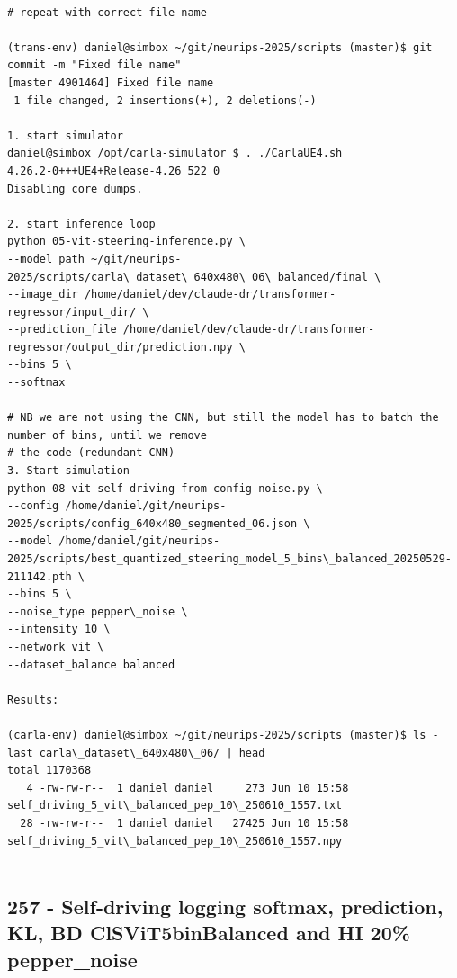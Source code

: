 \begin{verbatim}

# repeat with correct file name

(trans-env) daniel@simbox ~/git/neurips-2025/scripts (master)$ git commit -m "Fixed file name"
[master 4901464] Fixed file name
 1 file changed, 2 insertions(+), 2 deletions(-)
 
1. start simulator
daniel@simbox /opt/carla-simulator $ . ./CarlaUE4.sh 
4.26.2-0+++UE4+Release-4.26 522 0
Disabling core dumps.

2. start inference loop
python 05-vit-steering-inference.py \
--model_path ~/git/neurips-2025/scripts/carla\_dataset\_640x480\_06\_balanced/final \
--image_dir /home/daniel/dev/claude-dr/transformer-regressor/input_dir/ \
--prediction_file /home/daniel/dev/claude-dr/transformer-regressor/output_dir/prediction.npy \
--bins 5 \
--softmax

# NB we are not using the CNN, but still the model has to batch the number of bins, until we remove
# the code (redundant CNN)
3. Start simulation
python 08-vit-self-driving-from-config-noise.py \
--config /home/daniel/git/neurips-2025/scripts/config_640x480_segmented_06.json \
--model /home/daniel/git/neurips-2025/scripts/best_quantized_steering_model_5_bins\_balanced_20250529-211142.pth \
--bins 5 \
--noise_type pepper\_noise \
--intensity 10 \
--network vit \
--dataset_balance balanced

Results:

(carla-env) daniel@simbox ~/git/neurips-2025/scripts (master)$ ls -last carla\_dataset\_640x480\_06/ | head
total 1170368
   4 -rw-rw-r--  1 daniel daniel     273 Jun 10 15:58 self_driving_5_vit\_balanced_pep_10\_250610_1557.txt
  28 -rw-rw-r--  1 daniel daniel   27425 Jun 10 15:58 self_driving_5_vit\_balanced_pep_10\_250610_1557.npy


\end{verbatim}


\subsection{257 - Self-driving logging softmax, prediction, KL, BD ClSViT5binBalanced and HI 20\% pepper\_noise}
\label{app_res:257}

